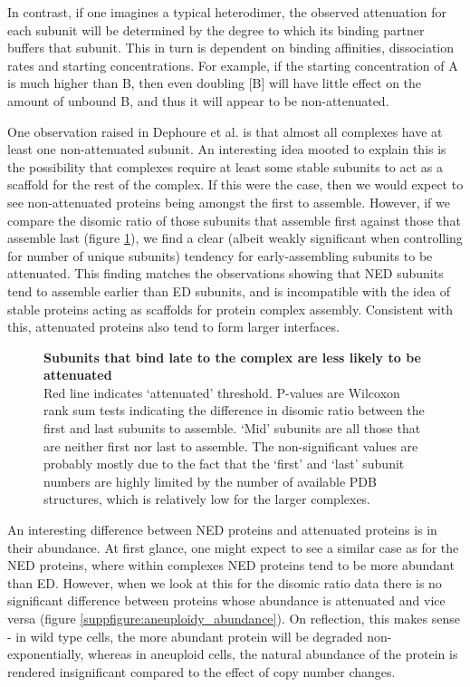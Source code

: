 \documentclass[a4paper,11pt,twoside,openright]{scrbook}
\begin{document}
In contrast, if one imagines a typical heterodimer, the observed attenuation for each subunit will be determined by the degree to which its binding partner buffers that subunit. This in turn is dependent on binding affinities, dissociation rates and starting concentrations. For example, if the starting concentration of A is much higher than B, then even doubling [B] will have little effect on the amount of unbound B, and thus it will appear to be non-attenuated.

One observation raised in Dephoure et al. is that almost all complexes have at least one non-attenuated subunit. An interesting idea mooted to explain this is the possibility that complexes require at least some stable subunits to act as a scaffold for the rest of the complex. If this were the case, then we would expect to see non-attenuated proteins being amongst the first to assemble. However, if we compare the disomic ratio of those subunits that assemble first against those that assemble last (figure \ref{figure:aneuploidy_assembly}), we find a clear (albeit weakly significant when controlling for number of unique subunits) tendency for early-assembling subunits to be attenuated. This finding matches the observations showing that NED subunits tend to assemble earlier than ED subunits, and is incompatible with the idea of stable proteins acting as scaffolds for protein complex assembly. Consistent with this, attenuated proteins also tend to form larger interfaces.

\begin{figure}[h]
    \caption[Subunits that bind late to the complex are less likely to be attenuated]{\sffamily \textbf{Subunits that bind late to the complex are less likely to be attenuated} \\ \small Red line indicates `attenuated' threshold. P-values are Wilcoxon rank sum tests indicating the difference in disomic ratio between the first and last subunits to assemble. `Mid' subunits are all those that are neither first nor last to assemble. The non-significant values are probably mostly due to the fact that the `first' and `last' subunit numbers are highly limited by the number of available PDB structures, which is relatively low for the larger complexes.}
    \label{figure:aneuploidy_assembly}
\end{figure}

An interesting difference between NED proteins and attenuated proteins is in their abundance. At first glance, one might expect to see a similar case as for the NED proteins, where within complexes NED proteins tend to be more abundant than ED. However, when we look at this for the disomic ratio data there is no significant difference between proteins whose abundance is attenuated and vice versa (figure \ref{suppfigure:aneuploidy_abundance}). On reflection, this makes sense - in wild type cells, the more abundant protein will be degraded non-exponentially, whereas in aneuploid cells, the natural abundance of the protein is rendered insignificant compared to the effect of copy number changes.
\end{document}
